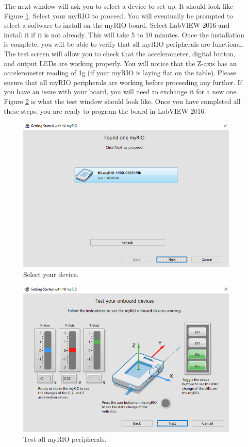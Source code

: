 \documentclass{article}
\begin{document}
The next window will ask you to select a device to set up. It should look like Figure \ref{fig:s_2}. Select your myRIO to proceed. You will eventually be prompted to select a software to install on the myRIO board. Select LabVIEW 2016 and install it if it is not already. This will take 5 to 10 minutes. Once the installation is complete, you will be able to verify that all myRIO peripherals are functional. The test screen will allow you to check that the accelerometer, digital button, and output LEDs are working properly. You will notice that the Z-axis has an accelerometer reading of 1g (if your myRIO is laying flat on the table). Please ensure that all myRIO peripherals are working before proceeding any further. If you have an issue with your board, you will need to exchange it for a new one. Figure \ref{fig:s_3} is what the test window should look like. Once you have completed all these steps, you are ready to program the board in LabVIEW 2016. 


\begin{figure}[h!]
\hspace{25mm}
\includegraphics[scale=0.6]{figs/setup_2.png}
\caption{Select your device.}
\label{fig:s_2}
\end{figure}

\begin{figure}[h!]
\hspace{25mm} 
\includegraphics[scale=0.6]{figs/setup_3.png}
\caption{Test all myRIO peripherals.}
\label{fig:s_3}
\end{figure}
\end{document}
